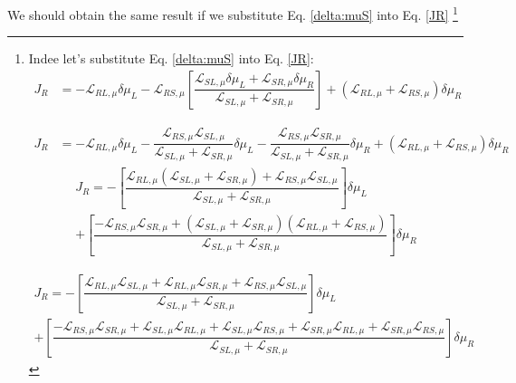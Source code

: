 We should obtain the same result if we substitute Eq. \eqref{delta:muS} into Eq. \eqref{JR} \footnote{Indee let's substitute Eq. \eqref{delta:muS} into Eq. \eqref{JR}:
\begin{align*}
J_{R}&= 
-\mathcal{L}_{RL,\mu}\delta\mu_{L} 
-\mathcal{L}_{RS,\mu}\left[\dfrac{\mathcal{L}_{SL,\mu}\delta\mu_{L}+\mathcal{L}_{SR,\mu}\delta\mu_{R}}{\mathcal{L}_{SL,\mu}+\mathcal{L}_{SR,\mu}}\right]
+
(\mathcal{L}_{RL,\mu}+\mathcal{L}_{RS,\mu})\delta\mu_{R}
\end{align*}

\begin{align*}
J_{R}&= 
-\mathcal{L}_{RL,\mu}\delta\mu_{L} 
-
\dfrac{\mathcal{L}_{RS,\mu}\mathcal{L}_{SL,\mu}}{\mathcal{L}_{SL,\mu}+\mathcal{L}_{SR,\mu}}\delta\mu_{L}
-
\dfrac{\mathcal{L}_{RS,\mu}\mathcal{L}_{SR,\mu}}{\mathcal{L}_{SL,\mu}+\mathcal{L}_{SR,\mu}}\delta\mu_{R}
+
(\mathcal{L}_{RL,\mu}+\mathcal{L}_{RS,\mu})\delta\mu_{R}
\end{align*}
\begin{multline*}
J_{R}= 
-\left[
\dfrac{\mathcal{L}_{RL,\mu}(\mathcal{L}_{SL,\mu}+\mathcal{L}_{SR,\mu})+\mathcal{L}_{RS,\mu}\mathcal{L}_{SL,\mu}}{\mathcal{L}_{SL,\mu}+\mathcal{L}_{SR,\mu}}\right]\delta\mu_{L}
\\+\left[
\dfrac{-\mathcal{L}_{RS,\mu}\mathcal{L}_{SR,\mu}+(\mathcal{L}_{SL,\mu}+\mathcal{L}_{SR,\mu})(\mathcal{L}_{RL,\mu}+\mathcal{L}_{RS,\mu})}{\mathcal{L}_{SL,\mu}+\mathcal{L}_{SR,\mu}}\right]\delta\mu_{R}
\end{multline*}

\begin{multline*}
J_{R}= 
-\left[
\dfrac{\mathcal{L}_{RL,\mu}\mathcal{L}_{SL,\mu}+\mathcal{L}_{RL,\mu}\mathcal{L}_{SR,\mu}+\mathcal{L}_{RS,\mu}\mathcal{L}_{SL,\mu}}{\mathcal{L}_{SL,\mu}+\mathcal{L}_{SR,\mu}}\right]\delta\mu_{L}
\\+\left[
\dfrac{-\mathcal{L}_{RS,\mu}\mathcal{L}_{SR,\mu}+\mathcal{L}_{SL,\mu}\mathcal{L}_{RL,\mu}
+\mathcal{L}_{SL,\mu}\mathcal{L}_{RS,\mu}
+\mathcal{L}_{SR,\mu}\mathcal{L}_{RL,\mu}
+\mathcal{L}_{SR,\mu}\mathcal{L}_{RS,\mu}}{\mathcal{L}_{SL,\mu}+\mathcal{L}_{SR,\mu}}\right]\delta\mu_{R}
\end{multline*}

}
